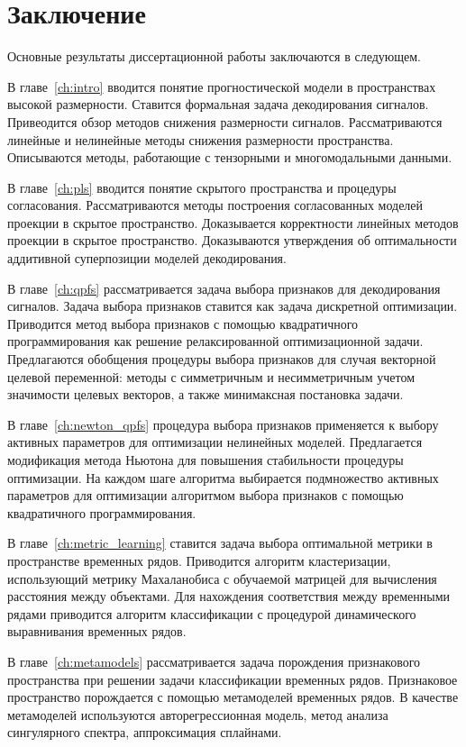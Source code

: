 \chapter*{Заключение}

Основные результаты диссертационной работы заключаются в следующем.

В главе~\ref{ch:intro} вводится понятие прогностической модели в пространствах высокой размерности.
Ставится формальная задача декодирования сигналов.
Привеодится обзор методов снижения размерности сигналов.
Рассматриваются линейные и нелинейные методы снижения размерности пространства.
Описываются методы, работающие с тензорными и многомодальными данными.

В главе~\ref{ch:pls} вводится понятие скрытого пространства и процедуры согласования.
Рассматриваются методы построения согласованных моделей проекции в скрытое пространство.
Доказывается корректности линейных методов проекции в скрытое пространство.
Доказываются утверждения об оптимальности аддитивной суперпозиции моделей декодирования.

В главе~\ref{ch:qpfs} рассматривается задача выбора признаков для декодирования сигналов.
Задача выбора признаков ставится как задача дискретной оптимизации. 
Приводится метод выбора признаков с помощью квадратичного программирования как решение релаксированной оптимизационной задачи.
Предлагаются обобщения процедуры выбора признаков для случая векторной целевой переменной: методы с симметричным и несимметричным учетом значимости целевых векторов, а также минимаксная постановка задачи.

В главе~\ref{ch:newton_qpfs} процедура выбора признаков применяется к выбору активных параметров для оптимизации нелинейных моделей.
Предлагается модификация метода Ньютона для повышения стабильности процедуры оптимизации.
На каждом шаге алгоритма выбирается подмножество активных параметров для оптимизации алгоритмом выбора признаков с помощью квадратичного программирования.

В главе~\ref{ch:metric_learning} ставится задача выбора оптимальной метрики в пространстве временных рядов.
Приводится алгоритм кластеризации, использующий метрику Махаланобиса с обучаемой матрицей для вычисления расстояния между объектами. 
Для нахождения соответствия между временными рядами приводится алгоритм классификации с процедурой динамического выравнивания временных рядов.

В главе~\ref{ch:metamodels} рассматривается задача порождения признакового пространства при решении задачи классификации временных рядов.
Признаковое пространство порождается с помощью метамоделей временных рядов.
В качестве метамоделей используются авторегрессионная модель, метод анализа сингулярного спектра, аппроксимация сплайнами.